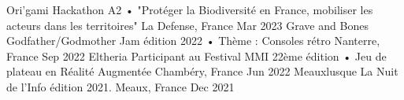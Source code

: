 


\begin{cvhonors}

\cvhonor
    {Ori'gami} %
    {Hackathon A2 • "Protéger la Biodiversité en France, mobiliser les acteurs dans les territoires"} %
    {La Defense, France} %
    {Mar 2023} %
\cvhonor
    {Grave and Bones} %
    {Godfather/Godmother Jam édition 2022 • Thème : Consoles rétro} %
    {Nanterre, France} %
    {Sep 2022} %
  \cvhonor
    {Eltheria} %
    {Participant au Festival MMI 22ème édition • Jeu de plateau en Réalité Augmentée} %
    {Chambéry, France} %
    {Jun 2022} %
  \cvhonor
    {Meauxlusque} %
    {La Nuit de l'Info édition 2021.} %
    {Meaux, France} %
    {Dec 2021} %
\end{cvhonors}